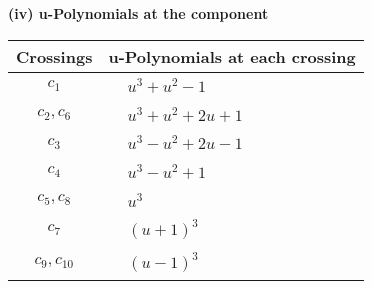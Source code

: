 \documentclass[1p]{elsarticle_modified}
\theoremstyle{definition}
\begin{document}
\newpage\renewcommand{\arraystretch}{1}
\flushleft \textbf{(iv) u-Polynomials at the component}\newline \\
\begin{tabular}{m{50pt}|m{274pt}}
Crossings & \hspace{64pt}u-Polynomials at each crossing \\
\hline $$\begin{aligned}c_{1}\end{aligned}$$&$\begin{aligned}
&u^3+u^2-1
\end{aligned}$\\
\hline $$\begin{aligned}c_{2},c_{6}\end{aligned}$$&$\begin{aligned}
&u^3+u^2+2 u+1
\end{aligned}$\\
\hline $$\begin{aligned}c_{3}\end{aligned}$$&$\begin{aligned}
&u^3- u^2+2 u-1
\end{aligned}$\\
\hline $$\begin{aligned}c_{4}\end{aligned}$$&$\begin{aligned}
&u^3- u^2+1
\end{aligned}$\\
\hline $$\begin{aligned}c_{5},c_{8}\end{aligned}$$&$\begin{aligned}
&u^3
\end{aligned}$\\
\hline $$\begin{aligned}c_{7}\end{aligned}$$&$\begin{aligned}
&(u+1)^3
\end{aligned}$\\
\hline $$\begin{aligned}c_{9},c_{10}\end{aligned}$$&$\begin{aligned}
&(u-1)^3
\end{aligned}$\\
\hline
\end{tabular}\\~\\
\newpage\renewcommand{\arraystretch}{1}
\end{document}

